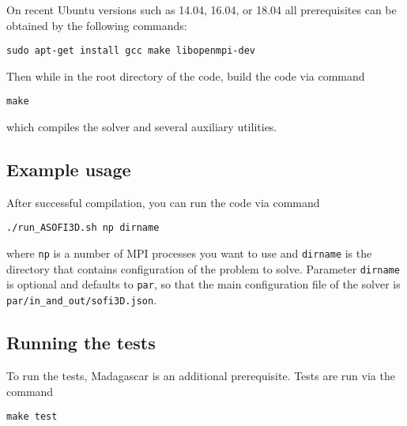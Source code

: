On recent Ubuntu versions such as 14.04, 16.04, or 18.04 all
prerequisites can be obtained by the following commands:

\begin{verbatim}
sudo apt-get install gcc make libopenmpi-dev
\end{verbatim}

Then while in the root directory of the code, build the code via command

\begin{verbatim}
make
\end{verbatim}

which compiles the solver and several auxiliary utilities.

\subsection{Example usage}\label{example-usage}

After successful compilation, you can run the code via command

\begin{verbatim}
./run_ASOFI3D.sh np dirname
\end{verbatim}

where \texttt{np} is a number of MPI processes you want to use and
\texttt{dirname} is the directory that contains configuration of the
problem to solve. Parameter \texttt{dirname} is optional and defaults to
\texttt{par}, so that the main configuration file of the solver is
\texttt{par/in\_and\_out/sofi3D.json}.

\subsection{Running the tests}\label{running-the-tests}

To run the tests, Madagascar is an additional prerequisite. Tests are
run via the command

\begin{verbatim}
make test
\end{verbatim}
